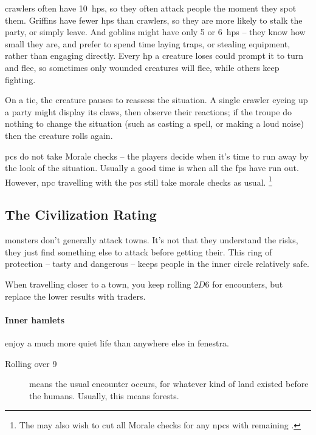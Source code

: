 \begin{multicols}{2}
\Glspl{crawler} often have 10~\glspl{hp}, so they often attack people the moment they spot them.
Griffins have fewer \glspl{hp} than \glspl{crawler}, so they are more likely to stalk the party, or simply leave.
And goblins might have only 5 or 6~\glspl{hp} -- they know how small they are, and prefer to spend time laying traps, or stealing equipment, rather than engaging directly.
Every \gls{hp} a creature loses could prompt it to turn and flee, so sometimes only wounded creatures will flee, while others keep fighting.

On a tie, the creature pauses to reassess the situation.
A single \gls{crawler} eyeing up a party might display its claws, then observe their reactions; if the troupe do nothing to change the situation (such as casting a spell, or making a loud noise) then the creature rolls again.

\Glspl{pc} do not take Morale checks -- the players decide when it's time to run away by the look of the situation.
Usually a good time is when all the \glspl{fp} have run out.
%
However, \gls{npc} travelling with the \glspl{pc} still take morale checks as usual.%
\footnote{The  may also wish to cut all Morale checks for any \glspl{npc} with remaining .}%

\subsection{The Civilization Rating}
\label{civilizationRating}

\Glspl{monster} don't generally attack towns.
It's not that they understand the risks, they just find something else to attack before getting their.
This ring of protection -- tasty and dangerous -- keeps people in the inner circle relatively safe.

When travelling closer to a town, you keep rolling $2D6$ for encounters, but replace the lower results with traders.

\paragraph{Inner hamlets}
enjoy a much more quiet life than anywhere else in \gls{fenestra}.

\begin{description}
  \item[Rolling over 9]
  means the usual encounter occurs, for whatever kind of land existed before the humans.
  Usually, this means forests.


\end{description}
\end{multicols}
